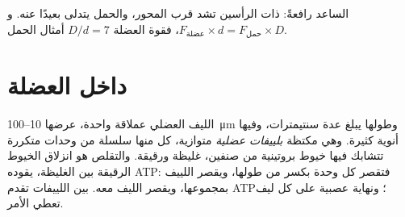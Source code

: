 \begin{omfigure}

{\small الساعد رافعةً: ذات الرأسين تشد قرب المحور، والحمل يتدلى بعيدًا
عنه. و$F_{\text{عضلة}} \times d =
F_{\text{حمل}} \times D$، فقوة العضلة $D/d = 7$ أمثال الحمل.}
\end{omfigure}

\section{داخل العضلة}

\begin{proposition}\label{prop:g10:muscles-and-joints:fibre}
الليف العضلي  عملاقة واحدة، عرضها \num{10}--\qty{100}{\micro m}
وطولها يبلغ عدة سنتيمترات، وفيها أنوية كثيرة. وهي مكتظة
\emph{بلييفات عضلية} متوازية، كل منها سلسلة من وحدات متكررة تتشابك
فيها خيوط بروتينية من صنفين، غليظة ورقيقة. والتقلص هو انزلاق الخيوط
الرقيقة بين الغليظة، يقوده ATP: فتقصر كل وحدة بكسر من طولها، ويقصر
اللييف بمجموعها، ويقصر الليف معه.  بين اللييفات تقدم ATP؛
ونهاية عصبية على كل ليف تعطي الأمر.
\end{proposition}
\admitted

